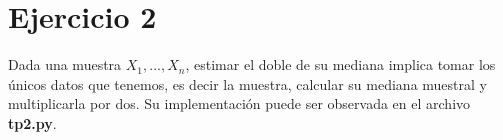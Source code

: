 \section{Ejercicio 2}
Dada una muestra $X_{1}, ..., X_{n}$, estimar el doble de su mediana implica tomar los únicos datos que tenemos, es decir la muestra, calcular su mediana muestral y multiplicarla por dos. Su implementación puede ser observada en el archivo \textbf{tp2.py}.